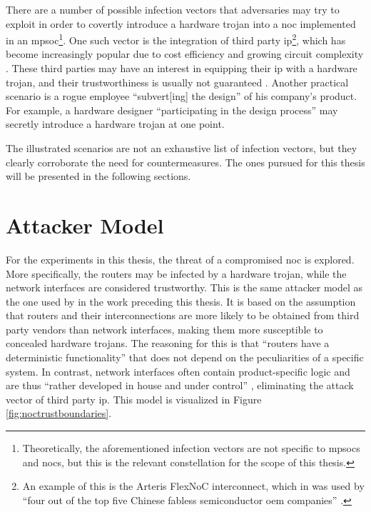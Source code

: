 There are a number of possible infection vectors that adversaries may try to exploit in order to covertly introduce a hardware trojan into a \gls{noc}
implemented in an \gls{mpsoc}\footnote{Theoretically, the aforementioned infection vectors are not specific to \glspl{mpsoc} and \glspl{noc}, but
this is the relevant constellation for the scope of this thesis.}. One such vector is the integration of third party \gls{ip}\footnote{An example of
this is the Arteris FlexNoC interconnect, which in \citeyear{ancajas14fortnocs} was used by \enquote{four out of the top five Chinese fabless
semiconductor \gls{oem} companies}
\cite[2]{ancajas14fortnocs}.}, which has become increasingly popular due to cost efficiency and growing circuit complexity
\cites[1]{ancajas14fortnocs}[2]{bhunia14hardwaretrojans}. These third parties may have an interest in equipping their \gls{ip} with a hardware trojan,
and their trustworthiness is usually not guaranteed \cite[3]{sethumadhavan15trustworthyhardware}.
Another practical scenario is a rogue employee \enquote{subvert[ing] the design} \cite[3]{sethumadhavan15trustworthyhardware} of his
company's product. For example, a hardware designer \enquote{participating in the design process} \cite[3]{sethumadhavan15trustworthyhardware} may
secretly introduce a hardware trojan at one point. 

The illustrated scenarios are not an exhaustive list of infection vectors, but they clearly corroborate the need for countermeasures. The ones pursued
for this thesis will be presented in the following sections.

\section{Attacker Model}
For the experiments in this thesis, the threat of a compromised \gls{noc} is explored. More specifically, the routers may be infected by a hardware
trojan, while the network interfaces are considered trustworthy. This is the same attacker model as the one used by \citeauthor{moriam18activeattackers}
\cite{moriam18activeattackers} in the work preceding this thesis. It is based on the assumption that routers and their interconnections are
more likely to be obtained from third party vendors than network interfaces, making them more susceptible to concealed hardware trojans. The reasoning
for this is that \enquote{routers have a deterministic functionality} \cite[2]{moriam18activeattackers} that does not depend on the peculiarities of
a specific system. In contrast, network interfaces often contain product-specific logic and are thus \enquote{rather developed in house and under
control} \cite[2]{moriam18activeattackers}, eliminating the attack vector of third party \gls{ip}. This model is visualized in Figure
\vref{fig:noctrustboundaries}.

